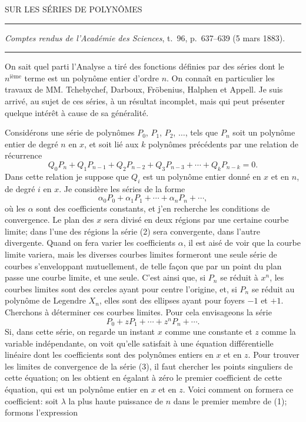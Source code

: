 \documentclass[11pt]{article}
\newcommand{\shortline}{\begin{center}\rule{3.5em}{0.4pt}\end{center}}
\begin{document}
\clearpage
\begin{center}
{\Large SUR LES SÉRIES DE POLYNÔMES}
\end{center}
\shortline
\begin{center}
\emph{Comptes rendus de l'Académie des Sciences}, t.~96, p.~637--639 (5 mars 1883).
\end{center}
\shortline

On sait quel parti l'Analyse a tiré des fonctions définies par des séries dont le $n^{\text{ième}}$ terme est un polynôme entier d'ordre $n$. On connaît en particulier les travaux de MM. Tchebychef, Darboux, Fröbenius, Halphen et Appell. Je suis arrivé, au sujet de ces séries, à un résultat incomplet, mais qui peut présenter quelque intérêt à cause de sa généralité.

Considérons une série de polynômes $P_0$, $P_1$, $P_2$, $\ldots$, tels que $P_n$ soit un polynôme entier de degré $n$ en $x$, et soit lié aux $k$ polynômes précédents par une relation de récurrence
\[
\tag{1}
Q_0P_n+Q_1P_{n-1}+Q_2P_{n-2}+Q_3P_{n-3}+\cdots+Q_kP_{n-k}=0.
\]
Dans cette relation je suppose que $Q_i$ est un polynôme entier donné en $x$ et en $n$, de degré $i$ en $x$. Je considère les séries de la forme
\[
\tag{2}
\alpha_0P_0+\alpha_1P_1+\cdots+\alpha_nP_n+\cdots,
\]
où les $\alpha$ sont des coefficients constants, et j'en recherche les conditions de convergence. Le plan des $x$ sera divisé en deux régions par une certaine courbe limite; dans l'une des régions la série (2) sera convergente, dans l'autre divergente. Quand on fera varier les coefficients $\alpha$, il est aisé de voir que la courbe limite variera, mais les diverses courbes limites formeront une seule série de courbes s'enveloppant mutuellement, de telle façon que par un point du plan passe une courbe limite, et une seule. C'est ainsi que, si $P_n$ se réduit à $x^n$, les courbes limites sont des cercles ayant pour centre l'origine, et, si $P_n$ se réduit au polynôme de Legendre $X_n$, elles sont des ellipses ayant pour foyers $-1$ et $+1$. Cherchons à déterminer ces courbes limites. Pour cela envisageons la série
\[
\tag{3}
P_0+zP_1+\cdots+z^nP_n+\cdots.
\]
Si, dans cette série, on regarde un instant $x$ comme une constante et $z$ comme la variable indépendante, on voit qu'elle satisfait à une équation différentielle linéaire dont les coefficients sont des polynômes entiers en $x$ et en $z$. Pour trouver les limites de convergence de la série (3), il faut chercher les points singuliers de cette équation; on les obtient en égalant à zéro le premier coefficient de cette équation, qui est un polynôme entier en $x$ et en $z$. Voici comment on formera ce coefficient: soit $\lambda$ la plus haute puissance de $n$ dans le premier membre de (1); formons l'expression
\end{document}
